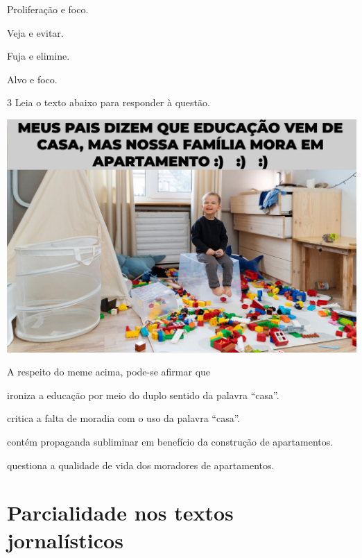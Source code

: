 {\begin{escolha}
  \item Proliferação e foco.
  
  \item Veja e evitar.
  
  \item Fuja e elimine.
  
  \item Alvo e foco. 

\end{escolha}

\num{3} Leia o texto abaixo para responder à questão.

\includegraphics[width=\textwidth]{./imgSAEB_7_POR/media/image7.png}

A respeito do meme acima, pode-se afirmar que

\begin{escolha}
    
    \item ironiza a educação por meio do duplo sentido da palavra ``casa''.
    
    \item critica a falta de moradia com o uso da palavra ``casa''.
    
    \item contém propaganda subliminar em benefício da construção de apartamentos.
    
    \item questiona a qualidade de vida dos moradores de apartamentos.

\end{escolha}

\chapter{Parcialidade nos textos jornalísticos}

}
